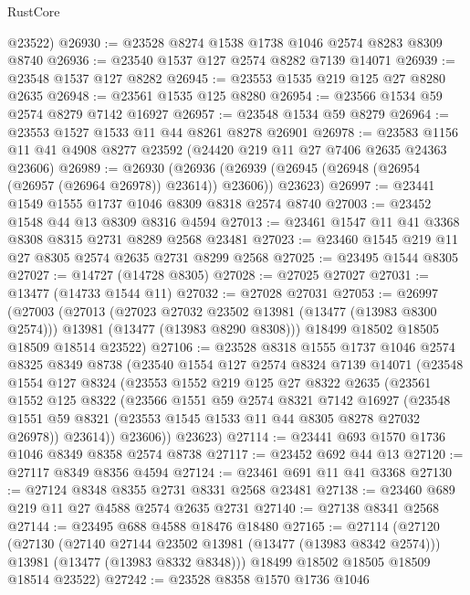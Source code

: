 \begin{lexlean}{RustCore}
\begin{coremodule}
      @23522)
@26930 := @23528 @8274 @1538 @1738 @1046 @2574 @8283 @8309 @8740
@26936 := @23540 @1537 @127 @2574 @8282 @7139 @14071
@26939 := @23548 @1537 @127 @8282
@26945 := @23553 @1535 @219 @125 @27 @8280 @2635
@26948 := @23561 @1535 @125 @8280
@26954 := @23566 @1534 @59 @2574 @8279 @7142 @16927
@26957 := @23548 @1534 @59 @8279
@26964 := @23553 @1527 @1533 @11 @44 @8261 @8278 @26901
@26978 := @23583 @1156 @11 @41 @4908 @8277 @23592 (@24420 @219 @11 @27 @7406 @2635 @24363 @23606)
@26989 := @26930
    (@26936 (@26939 (@26945 (@26948 (@26954 (@26957 (@26964 @26978)) @23614)) @23606)) @23623)
@26997 := @23441 @1549 @1555 @1737 @1046 @8309 @8318 @2574 @8740
@27003 := @23452 @1548 @44 @13 @8309 @8316 @4594
@27013 := @23461 @1547 @11 @41 @3368 @8308 @8315 @2731 @8289 @2568 @23481
@27023 := @23460 @1545 @219 @11 @27 @8305 @2574 @2635 @2731 @8299 @2568
@27025 := @23495 @1544 @8305
@27027 := @14727 (@14728 @8305)
@27028 := @27025 @27027
@27031 := @13477 (@14733 @1544 @11)
@27032 := @27028 @27031
@27053 := @26997
    (@27003
      (@27013
        (@27023 @27032 @23502 @13981 (@13477 (@13983 @8300 @2574)))
        @13981
        (@13477 (@13983 @8290 @8308)))
      @18499
      @18502
      @18505
      @18509
      @18514
      @23522)
@27106 := @23528
    @8318
    @1555
    @1737
    @1046
    @2574
    @8325
    @8349
    @8738
    (@23540
      @1554
      @127
      @2574
      @8324
      @7139
      @14071
      (@23548
        @1554
        @127
        @8324
        (@23553
          @1552
          @219
          @125
          @27
          @8322
          @2635
          (@23561
            @1552
            @125
            @8322
            (@23566
              @1551
              @59
              @2574
              @8321
              @7142
              @16927
              (@23548 @1551 @59 @8321 (@23553 @1545 @1533 @11 @44 @8305 @8278 @27032 @26978))
              @23614))
          @23606))
      @23623)
@27114 := @23441 @693 @1570 @1736 @1046 @8349 @8358 @2574 @8738
@27117 := @23452 @692 @44 @13
@27120 := @27117 @8349 @8356 @4594
@27124 := @23461 @691 @11 @41 @3368
@27130 := @27124 @8348 @8355 @2731 @8331 @2568 @23481
@27138 := @23460 @689 @219 @11 @27 @4588 @2574 @2635 @2731
@27140 := @27138 @8341 @2568
@27144 := @23495 @688 @4588 @18476 @18480
@27165 := @27114
    (@27120
      (@27130
        (@27140 @27144 @23502 @13981 (@13477 (@13983 @8342 @2574)))
        @13981
        (@13477 (@13983 @8332 @8348)))
      @18499
      @18502
      @18505
      @18509
      @18514
      @23522)
@27242 := @23528
    @8358
    @1570
    @1736
    @1046

\end{coremodule}
\end{lexlean}
